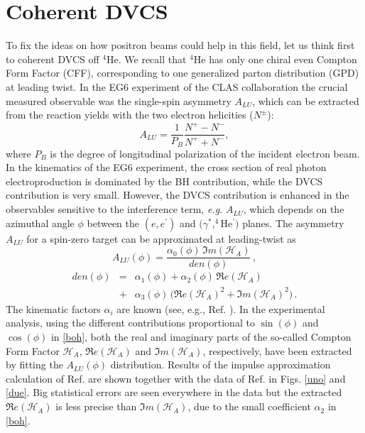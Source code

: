 \documentclass[times, twoside]{PosWhiPap}
\begin{document}
\section*{Coherent DVCS}
To fix the ideas on how positron beams could help in this field, 
let us think first to coherent DVCS off $^4$He.
We recall that $^4$He has only one chiral even Compton Form Factor (CFF), corresponding
to one generalized parton distribution (GPD) at 
   leading twist. In the EG6 experiment of the CLAS collaboration
   \cite{Hattawy:2017woc}
   the crucial measured
observable was the single-spin asymmetry
$A_{LU}$, which can be extracted from the reaction yields with the two electron
helicities ($N^{\pm}$):
\begin{equation}
A_{LU} = \frac{1}{P_{B}} \frac{N^{+} - N^{-}}{N^{+} + N^{-} },
\end{equation}
where $P_{B}$ is the degree of longitudinal polarization of the incident 
electron beam.
 In the kinematics of the EG6 experiment, the cross section of real photon electroproduction is 
   dominated by the BH contribution, while the DVCS contribution is very small.  
   However, the DVCS contribution is enhanced in the observables sensitive to 
   the interference term, {\it e.g.} $A_{LU}$, which depends on the
azimuthal angle $\phi$ between the $(e,e^\prime)$ and 
   $(\gamma^*,^4$He$^\prime)$ planes. The asymmetry $A_{LU}$ for a spin-zero 
   target can be approximated at leading-twist as
\begin{equation}
A_{LU}(\phi) = 
\frac{\alpha_{0}(\phi) \, \Im m(\mathcal{H}_{A})} 
{den(\phi)} \, ,
\end{equation}
\begin{eqnarray}
den(\phi) & = & 
\alpha_{1}(\phi) + \alpha_{2}(\phi) \, \Re e(\mathcal{H}_{A}) 
\nonumber
\\
& + & \alpha_{3}(\phi) \, 
\big( \Re e(\mathcal{H}_{A})^{2} + \Im m(\mathcal{H}_{A})^{2} \big)\, .
\label{boh}
\end{eqnarray}
The kinematic factors $\alpha_i$ are known (see, e.g., Ref.  
\cite{Belitsky:2001ns,Belitsky:2008bz}). 
In the experimental analysis,
using the different contributions proportional to
$\sin(\phi)$ and 
$\cos(\phi)$ in \eqref{boh},  both the real and 
imaginary parts of the so-called Compton Form Factor $\mathcal{H}_{A}$,
$\Re e(\mathcal{H}_{A})$ and $\Im m(\mathcal{H}_{A})$, respectively,
have been extracted by fitting the $A_{LU}(\phi)$ distribution. 
Results of the impulse approximation calculation  
of Ref. \cite{Fucini:2018gso} are shown together with the data 
of Ref. \cite{Hattawy:2017woc} in Figs. \ref{uno} and \ref{due}.
Big statistical errors are seen everywhere in the data but the extracted $\Re 
e(\mathcal{H}_{A})$ is less precise than $\Im m(\mathcal{H}_{A})$, due to the small 
coefficient $\alpha_2$ in \eqref{boh}.
\end{document}
